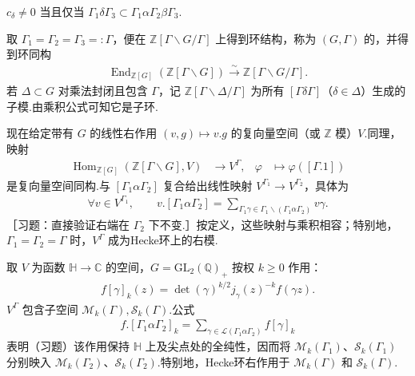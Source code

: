 \begin{remark*}

$c_\delta\ne0$ 当且仅当 $\Gamma_1\delta\Gamma_3\subset\Gamma_1\alpha\Gamma_2\beta\Gamma_3$.

\end{remark*}

取 $\Gamma_1=\Gamma_2=\Gamma_3=:\Gamma$，便在 $\mathbb Z[\Gamma\backslash G/\Gamma]$ 上得到环结构，称为 $(G,\Gamma)$ 的，并得到环同构
\begin{align*}
\operatorname{End}_{\mathbb Z[G]}(\mathbb Z[\Gamma\backslash G])\xrightarrow{\sim}\mathbb Z[\Gamma\backslash G/\Gamma].
\end{align*}
若 $\Delta\subset G$ 对乘法封闭且包含 $\Gamma$，记 $\mathbb Z[\Gamma\backslash\Delta/\Gamma]$ 为所有 $[\Gamma\delta\Gamma]$（$\delta\in\Delta$）生成的子模.由乘积公式可知它是子环.

现在给定带有 $G$ 的线性右作用 $(v,g)\mapsto v.g$ 的复向量空间（或 $\mathbb Z$ 模）$V$.同理，映射
\begin{align*}
\operatorname{Hom}_{\mathbb Z[G]}(\mathbb Z[\Gamma\backslash G],V)&\longrightarrow V^\Gamma,&\varphi&\longmapsto\varphi([\Gamma.1])
\end{align*}
是复向量空间同构.与 $[\Gamma_1\alpha\Gamma_2]$ 复合给出线性映射 $V^{\Gamma_1}\to V^{\Gamma_2}$，具体为
\begin{align*}
\forall v\in V^{\Gamma_1},\qquad v.[\Gamma_1\alpha\Gamma_2]=\sum_{\Gamma_1\gamma\in\Gamma_1\backslash(\Gamma_1\alpha\Gamma_2)}v\gamma.
\end{align*}
［习题：直接验证右端在 $\Gamma_2$ 下不变.］按定义，这些映射与乘积相容；特别地，$\Gamma_1=\Gamma_2=\Gamma$ 时，$V^\Gamma$ 成为Hecke环上的右模.

\begin{example*}

取 $V$ 为函数 $\mathbb H\to\mathbb C$ 的空间，$G=\mathrm{GL}_2(\mathbb Q)_+$ 按权 $k\ge0$ 作用：
\begin{align*}
f[\gamma]_k(z)=\det(\gamma)^{k/2}j_\gamma(z)^{-k}f(\gamma z).
\end{align*}
$V^\Gamma$ 包含子空间 $\mathcal M_k(\Gamma),\mathcal S_k(\Gamma)$.公式
\begin{align*}
f.[\Gamma_1\alpha\Gamma_2]_k=\sum_{\gamma\in\mathcal L(\Gamma_1\alpha\Gamma_2)}f[\gamma]_k
\end{align*}
表明（习题）该作用保持 $\mathbb H$ 上及尖点处的全纯性，因而将 $\mathcal M_k(\Gamma_1)$、$\mathcal S_k(\Gamma_1)$ 分别映入 $\mathcal M_k(\Gamma_2)$、$\mathcal S_k(\Gamma_2)$.特别地，Hecke环右作用于 $\mathcal M_k(\Gamma)$ 和 $\mathcal S_k(\Gamma)$.

\end{example*}

